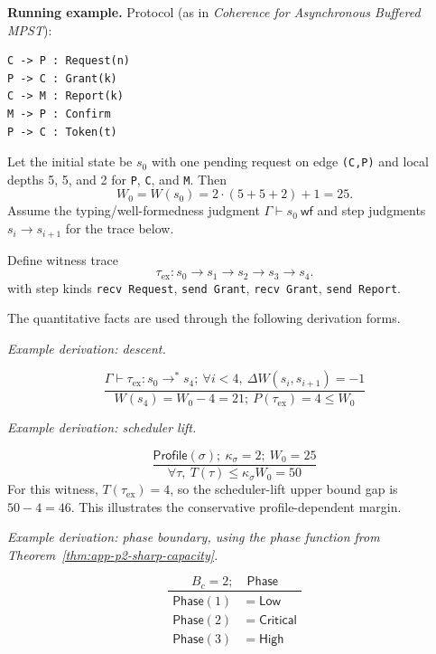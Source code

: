 \documentclass[a4paper,10pt,twocolumn,english]{article}
\numberwithin{equation}{section}
\theoremstyle{paperdef}
\theoremstyle{paperplain}
\theoremstyle{paperdef}
\theoremstyle{paperremark}
\newcommand{\wf}{\ensuremath{\mathsf{wf}}}
\newcommand{\Bc}{\ensuremath{B_c}}
\newcommand{\Profile}{\ensuremath{\mathsf{Profile}}}
\newcommand{\Phase}{\ensuremath{\mathsf{Phase}}}
\newcommand{\eqnote}[1]{\par\noindent\textit{#1.}\par\vspace{2pt}}
\begin{document}
\noindent\begingroup\raggedright
\textbf{Running example.} Protocol (as in \emph{Coherence for Asynchronous Buffered MPST}):
\par\endgroup

\noindent\begin{minipage}{\columnwidth}
	\begin{lstlisting}
C -> P : Request(n)
P -> C : Grant(k)
C -> M : Report(k)
M -> P : Confirm
P -> C : Token(t)
\end{lstlisting}
\end{minipage}

Let the initial state be $s_0$ with one pending request on edge \texttt{(C,P)} and local depths 5, 5, and 2 for \texttt{P}, \texttt{C}, and \texttt{M}. Then
\begin{equation}
	W_0 = W(s_0) = 2 \cdot (5+5+2) + 1 = 25.
\end{equation}
Assume the typing/well-formedness judgment $\Gamma \vdash s_0\ \wf$ and step judgments $s_i \to s_{i+1}$ for the trace below.

Define witness trace
\begin{equation}
	\tau_{\mathrm{ex}}: s_0 \to s_1 \to s_2 \to s_3 \to s_4.
\end{equation}
with step kinds \texttt{recv Request}, \texttt{send Grant}, \texttt{recv Grant}, \texttt{send Report}.

The quantitative facts are used through the following derivation forms.

\eqnote{Example derivation: descent}
\begingroup
\small
\begin{equation}
	\dfrac{
	\Gamma \vdash \tau_{\mathrm{ex}}: s_0 \to^\ast s_4;\ \forall i<4,\ \Delta W(s_i,s_{i+1})=-1
	}{
	W(s_4)=W_0-4=21;\ P(\tau_{\mathrm{ex}})=4\le W_0
	}
\end{equation}
\endgroup
\eqnote{Example derivation: scheduler lift}
\begin{equation}
	\dfrac{
		\Profile(\sigma);\ \kappa_\sigma=2;\ W_0=25
	}{
		\forall \tau,\ T(\tau)\le \kappa_\sigma W_0 = 50
	}
\end{equation}
For this witness, $T(\tau_{\mathrm{ex}})=4$, so the scheduler-lift upper bound gap is $50-4=46$. This illustrates the conservative profile-dependent margin.
\eqnote{Example derivation: phase boundary, using the phase function from Theorem~\ref{thm:app-p2-sharp-capacity}}
\begin{equation}
	\dfrac{
		\Bc=2;\quad \Phase
	}{
		\begin{aligned}
			\Phase(1) & =\mathsf{Low}      \\
			\Phase(2) & =\mathsf{Critical} \\
			\Phase(3) & =\mathsf{High}
		\end{aligned}
	}
\end{equation}
\end{document}
